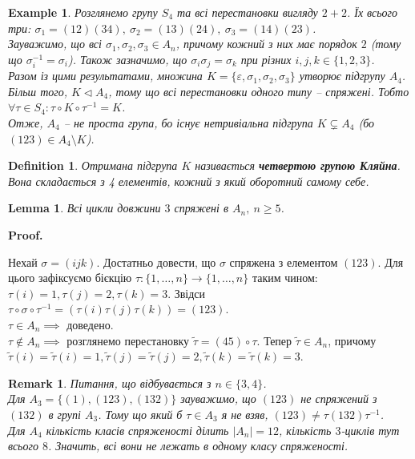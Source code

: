 \documentclass[a4paper, 10pt]{article}
\makeatletter
\theoremstyle{theoremdd}
\theoremstyle{theoremdd}
\newtheorem{definition}[theorem]{Definition}
\theoremstyle{theoremdd}
\theoremstyle{theoremdd}
\theoremstyle{theoremdd}
\newtheorem{example}[theorem]{Example}
\theoremstyle{theoremdd}
\theoremstyle{theoremdd}
\theoremstyle{theoremdd}
\theoremstyle{theoremdd}
\theoremstyle{theoremdd}
\theoremstyle{theoremdd}
\newtheorem{remark}[theorem]{Remark}
\theoremstyle{theoremdd}
\theoremstyle{theoremdd}
\newtheorem{lemma}[theorem]{Lemma}
\theoremstyle{theoremdd}
\theoremstyle{theoremdd}
\renewenvironment{proof}[1][Proof.\\]{\par
\pushQED{\hfill \qed}%
\normalfont \topsep6\p@\@plus6\p@\relax
\trivlist
\item\relax
{\bfseries
#1\@addpunct{.}}\hspace\labelsep\ignorespaces
}{%
\popQED\endtrivlist\@endpefalse
}
\makeatother
\begin{document}
\begin{example}
Розглянемо групу $S_4$ та всі перестановки вигляду $2+2$. Їх всього три: $\sigma_1 = (12)(34),\ \sigma_2 = (13)(24),\ \sigma_3 = (14)(23)$.\\
Зауважимо, що всі $\sigma_1,\sigma_2,\sigma_3 \in A_n$, причому кожний з них має порядок $2$ (тому що $\sigma_i^{-1} = \sigma_i$). Також зазначимо, що $\sigma_i \sigma_j = \sigma_k$ при різних $i,j,k \in \{1,2,3\}$.\\
Разом із цими результатами, множина $K = \{\varepsilon,\sigma_1,\sigma_2,\sigma_3\}$ утворює підгрупу $A_4$. Більш того, $K \triangleleft A_4$, тому що всі перестановки одного типу -- спряжені. Тобто $\forall \tau \in S_4: \tau \circ K \circ \tau^{-1} = K$.\\
Отже, $A_4$ -- не проста група, бо існує нетривіальна підгрупа $K \subsetneq A_4$ (бо $(123) \in A_4 \setminus K$).
\end{example}

\begin{definition}
Отримана підгрупа $K$ називається \textbf{четвертою групою Кляйна}. Вона складається з 4 елементів, кожний з який оборотний самому себе.
\end{definition}

\begin{lemma}
Всі цикли довжини $3$ спряжені в $A_n,\ n \geq 5$.
\end{lemma}

\begin{proof}
Нехай $\sigma = (ijk)$. Достатньо довести, що $\sigma$ спряжена з елементом $(123)$. Для цього зафіксуємо бієкцію $\tau \colon \{1,\dots,n\} \to \{1,\dots,n\}$ таким чином: $\tau(i) = 1, \tau(j) = 2, \tau(k) = 3$. Звідси\\
$\tau \circ \sigma \circ \tau^{-1} = (\tau(i) \tau(j) \tau(k)) = (123)$.\\
$\tau \in A_n \implies$ доведено.\\
$\tau \notin A_n \implies$ розглянемо перестановку $\tilde{\tau} = (45) \circ \tau$. Тепер $\tilde{\tau} \in A_n$, причому $\tilde{\tau}(i) = \tilde{\tau}(i) = 1, \tilde{\tau}(j) = \tilde{\tau}(j) = 2, \tilde{\tau}(k) = \tilde{\tau}(k) = 3$.
\end{proof}

\begin{remark}
Питання, що відбувається з $n \in \{3,4\}$.\\
Для $A_3 = \{ (1), (123), (132) \}$ зауважимо, що $(123)$ не спряжений з $(132)$ в групі $A_3$. Тому що який б $\tau \in A_3$ я не взяв, $(123) \neq \tau (132) \tau^{-1}$.\\
Для $A_4$ кількість класів спряженості ділить $|A_n| = 12$, кількість $3$-циклів тут всього $8$. Значить, всі вони не лежать в одному класу спряженості.
\end{remark}
\end{document}
